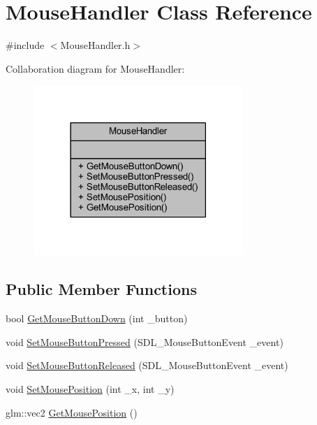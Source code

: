 \hypertarget{class_mouse_handler}{}\section{Mouse\+Handler Class Reference}
\label{class_mouse_handler}


{\ttfamily \#include $<$Mouse\+Handler.\+h$>$}



Collaboration diagram for Mouse\+Handler\+:
\nopagebreak
\begin{figure}[H]
\begin{center}
\leavevmode
\includegraphics[width=225pt]{class_mouse_handler__coll__graph}
\end{center}
\end{figure}
\subsection*{Public Member Functions}
\begin{DoxyCompactItemize}
\item 
bool \mbox{\hyperlink{class_mouse_handler_a20fc955fca9c7a4b8c621b95270df0e7}{Get\+Mouse\+Button\+Down}} (int \+\_\+button)
\item 
void \mbox{\hyperlink{class_mouse_handler_a0572e9d8c3993813e4e91905cd64b6d3}{Set\+Mouse\+Button\+Pressed}} (S\+D\+L\+\_\+\+Mouse\+Button\+Event \+\_\+event)
\item 
void \mbox{\hyperlink{class_mouse_handler_a87c9624aabb7e7377dbf4c2eea544bee}{Set\+Mouse\+Button\+Released}} (S\+D\+L\+\_\+\+Mouse\+Button\+Event \+\_\+event)
\item 
void \mbox{\hyperlink{class_mouse_handler_a6b21ab3506b8bd90043f887ec43d93e2}{Set\+Mouse\+Position}} (int \+\_\+x, int \+\_\+y)
\item 
glm\+::vec2 \mbox{\hyperlink{class_mouse_handler_ad845f8049b6a4b22dc337943ba13726e}{Get\+Mouse\+Position}} ()
\end{DoxyCompactItemize}



